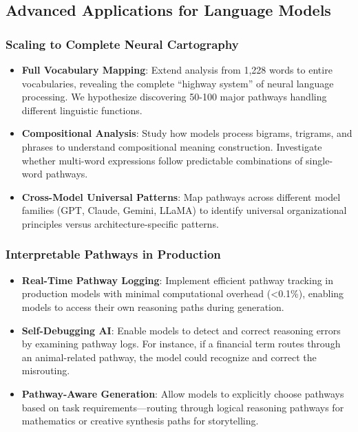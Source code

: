 \subsection{Advanced Applications for Language Models}

\subsubsection{Scaling to Complete Neural Cartography}

\begin{itemize}
    \item \textbf{Full Vocabulary Mapping}: Extend analysis from 1,228 words to entire vocabularies, revealing the complete ``highway system'' of neural language processing. We hypothesize discovering 50-100 major pathways handling different linguistic functions.
    
    \item \textbf{Compositional Analysis}: Study how models process bigrams, trigrams, and phrases to understand compositional meaning construction. Investigate whether multi-word expressions follow predictable combinations of single-word pathways.
    
    \item \textbf{Cross-Model Universal Patterns}: Map pathways across different model families (GPT, Claude, Gemini, LLaMA) to identify universal organizational principles versus architecture-specific patterns.
\end{itemize}

\subsubsection{Interpretable Pathways in Production}

\begin{itemize}
    \item \textbf{Real-Time Pathway Logging}: Implement efficient pathway tracking in production models with minimal computational overhead (<0.1\%), enabling models to access their own reasoning paths during generation.
    
    \item \textbf{Self-Debugging AI}: Enable models to detect and correct reasoning errors by examining pathway logs. For instance, if a financial term routes through an animal-related pathway, the model could recognize and correct the misrouting.
    
    \item \textbf{Pathway-Aware Generation}: Allow models to explicitly choose pathways based on task requirements—routing through logical reasoning pathways for mathematics or creative synthesis paths for storytelling.
\end{itemize}

